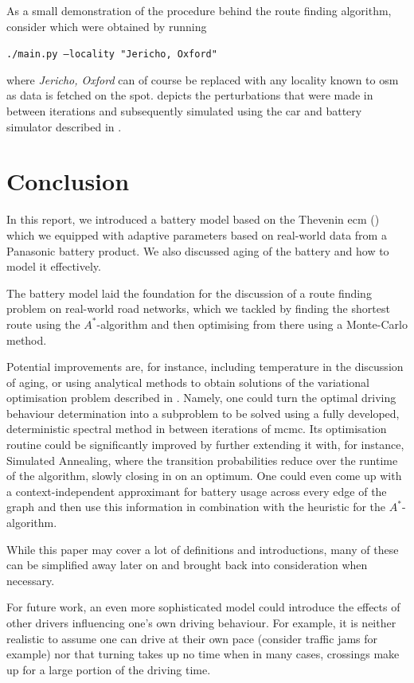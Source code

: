 \documentclass{prettytex/ox/mmsc-special-topic}
\begin{document}
  As a small demonstration of the procedure behind the route finding algorithm, consider  which were obtained by running \\
  \centerline{\texttt{./main.py --locality "Jericho, Oxford"}}
  where \textit{Jericho, Oxford} can of course be replaced with any locality known to \gls{osm} as data is fetched on the spot.
   depicts the perturbations that were made in between iterations and subsequently simulated using the car and battery simulator described in .

  \section{Conclusion}
  \label{sec:discussion}
  In this report, we introduced a battery model based on the Thevenin \gls{ecm} () which we equipped with adaptive parameters based on real-world data from a Panasonic battery product.
  We also discussed aging of the battery and how to model it effectively.

  The battery model laid the foundation for the discussion of a route finding problem on real-world road networks, which we tackled by finding the shortest route using the $A^*$-algorithm and then optimising from there using a Monte-Carlo method.

  Potential improvements are, for instance, including temperature in the discussion of aging, or using analytical methods to obtain solutions of the variational optimisation problem described in .
  Namely, one could turn the optimal driving behaviour determination into a subproblem to be solved using a fully developed, deterministic spectral method in between iterations of \gls{mcmc}.
  Its optimisation routine could be significantly improved by further extending it with, for instance, Simulated Annealing, where the transition probabilities reduce over the runtime of the algorithm, slowly closing in on an optimum.
  One could even come up with a context-independent approximant for battery usage across every edge of the graph and then use this information in combination with the heuristic for the $A^*$-algorithm.

  While this paper may cover a lot of definitions and introductions, many of these can be simplified away later on and brought back into consideration when necessary.

  For future work, an even more sophisticated model could introduce the effects of other drivers influencing one's own driving behaviour.
  For example, it is neither realistic to assume one can drive at their own pace (consider traffic jams for example) nor that turning takes up no time when in many cases, crossings make up for a large portion of the driving time.
\end{document}
